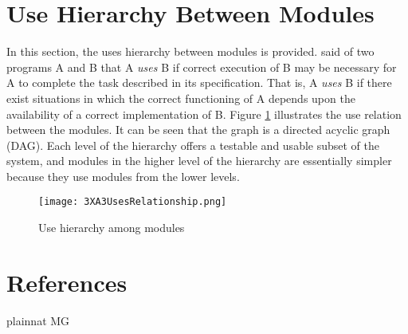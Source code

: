 \documentclass[12pt, titlepage]{article}
\begin{document}
\section{Use Hierarchy Between Modules} \label{SecUse}

In this section, the uses hierarchy between modules is
provided. \citet{Parnas1978} said of two programs A and B that A {\em uses} B if
correct execution of B may be necessary for A to complete the task described in
its specification. That is, A {\em uses} B if there exist situations in which
the correct functioning of A depends upon the availability of a correct
implementation of B.  Figure \ref{FigUH} illustrates the use relation between
the modules. It can be seen that the graph is a directed acyclic graph
(DAG). Each level of the hierarchy offers a testable and usable subset of the
system, and modules in the higher level of the hierarchy are essentially simpler
because they use modules from the lower levels.

\begin{figure}[H]
\centering
\texttt{[image: 3XA3UsesRelationship.png]}
\caption{Use hierarchy among modules}
\label{FigUH}
\end{figure}

\section*{References}

 {plainnat}
 {MG}
\end{document}
